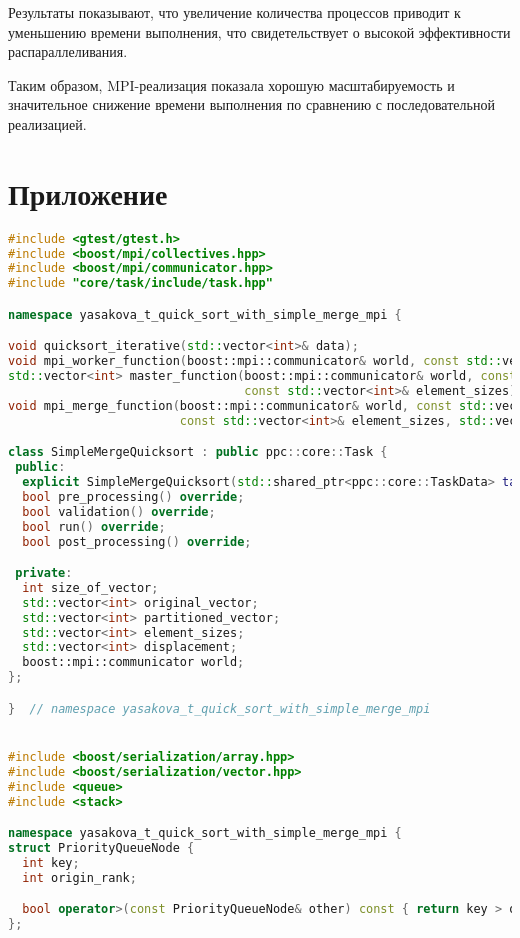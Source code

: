 \documentclass[a4paper,12pt]{article}
\begin{document}
Результаты показывают, что увеличение количества процессов приводит к уменьшению времени выполнения, что свидетельствует о высокой эффективности распараллеливания.

Таким образом, MPI-реализация показала хорошую масштабируемость и значительное снижение времени выполнения по сравнению с последовательной реализацией.


\newpage

\section*{\centering Приложение}
\begin{lstlisting}[language=C++,caption={Код программы}]
#include <gtest/gtest.h>
#include <boost/mpi/collectives.hpp>
#include <boost/mpi/communicator.hpp>
#include "core/task/include/task.hpp"

namespace yasakova_t_quick_sort_with_simple_merge_mpi {

void quicksort_iterative(std::vector<int>& data);
void mpi_worker_function(boost::mpi::communicator& world, const std::vector<int>& local_data);
std::vector<int> master_function(boost::mpi::communicator& world, const std::vector<int>& local_data,
                                 const std::vector<int>& element_sizes);
void mpi_merge_function(boost::mpi::communicator& world, const std::vector<int>& local_data,
                        const std::vector<int>& element_sizes, std::vector<int>& res);

class SimpleMergeQuicksort : public ppc::core::Task {
 public:
  explicit SimpleMergeQuicksort(std::shared_ptr<ppc::core::TaskData> taskData_) : Task(std::move(taskData_)) {}
  bool pre_processing() override;
  bool validation() override;
  bool run() override;
  bool post_processing() override;

 private:
  int size_of_vector;
  std::vector<int> original_vector;
  std::vector<int> partitioned_vector;
  std::vector<int> element_sizes;
  std::vector<int> displacement;
  boost::mpi::communicator world;
};

}  // namespace yasakova_t_quick_sort_with_simple_merge_mpi


#include <boost/serialization/array.hpp>
#include <boost/serialization/vector.hpp>
#include <queue>
#include <stack>

namespace yasakova_t_quick_sort_with_simple_merge_mpi {
struct PriorityQueueNode {
  int key;
  int origin_rank;

  bool operator>(const PriorityQueueNode& other) const { return key > other.key; }
};


\end{lstlisting}
\end{document}
